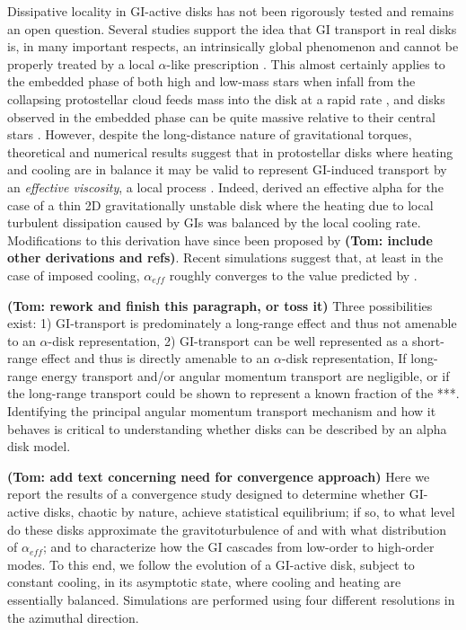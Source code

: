 \documentclass[manuscript]{aastex} %
\begin{document}
Dissipative locality in GI-active disks has not been rigorously tested and remains an open question. 
Several studies support the idea that GI transport in real disks is, in many important respects, an intrinsically global phenomenon and cannot be properly treated by a local $\alpha$-like prescription \citep{laughlin1996, balbus1999, lodato2005, mejia2005, boley2006, cai2008}.  This almost certainly applies to the embedded phase of both high and low-mass stars when infall from the collapsing protostellar cloud feeds mass into the disk at a rapid
rate \citep[e.g.]{yorke1993, laughlin1994, yorke1999,vorobyov2005,vorobyov2006}, and disks observed in the embedded phase can be quite massive relative to their central stars \citep[e.g.]{osorio2003}. 
However, despite the long-distance nature of gravitational torques, theoretical and numerical results suggest that in protostellar disks where heating and cooling are in balance it may be valid to represent GI-induced transport by an {\it effective viscosity}, a local process \citep[e.g.]{gammie2001, rice2005, lodato2004}. Indeed, \citet{gammie2001} derived an effective alpha for the case of a thin 2D gravitationally unstable disk where the heating due to local turbulent dissipation caused by GIs was balanced by the local cooling rate.  Modifications to this derivation have since been proposed by {\bf (Tom: include other derivations and refs)}.   Recent simulations \citep[e.g.]{cossins2009, vorobyov2010} suggest that, at least in the case of imposed cooling, $\alpha_{eff}$ roughly converges to the value predicted by \citeauthor{gammie2001}. 

{\bf (Tom: rework and finish this paragraph, or toss it)}
Three possibilities exist: 1) GI-transport is predominately a long-range effect and thus not 
amenable to an $\alpha$-disk representation, 2) GI-transport can be well represented as
a short-range effect and thus is directly amenable to an $\alpha$-disk representation,
If long-range energy transport and/or angular momentum transport are negligible,  or if
the long-range transport could be shown to represent a known fraction of the 
***. 
Identifying the principal angular momentum transport mechanism
and how it behaves is critical to understanding whether disks can be described by an alpha disk model.

{\bf (Tom: add text concerning need for convergence approach)}
Here we report the results of a convergence study designed to determine whether GI-active disks, chaotic by nature, achieve statistical equilibrium; if so, to what level do these disks approximate the gravitoturbulence of \citet{gammie2001} and with what distribution of $\alpha_{eff}$; and to characterize how the GI cascades from low-order to high-order modes. To this end, we follow the evolution of a GI-active disk, subject to constant cooling, in its asymptotic state, where cooling and heating are essentially balanced.  Simulations are performed using four different resolutions in the azimuthal direction.
\end{document}
